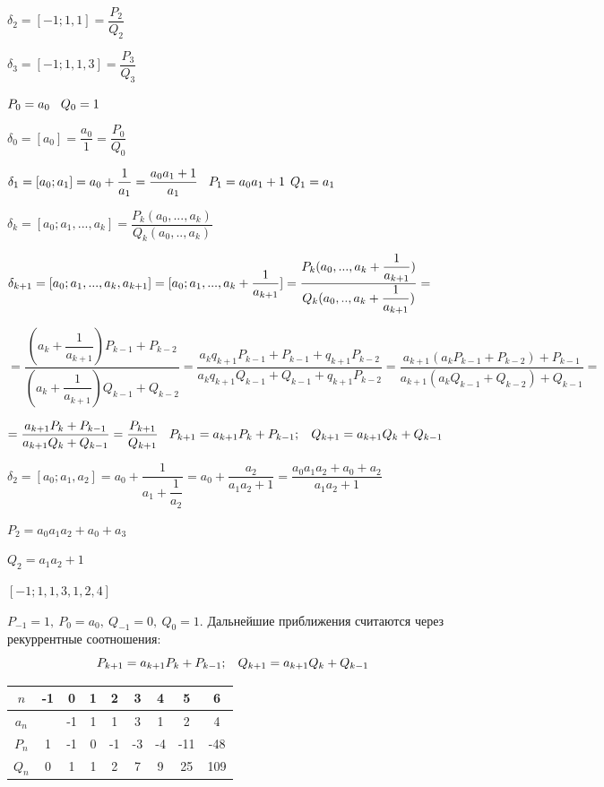 \documentclass[12pt]{article}
\begin{document}
$\delta_2 = [-1;1,1] = \dfrac{P_2}{Q_2}$

$\delta_3 = [-1;1,1,3] = \dfrac{P_3}{Q_3}$

$P_0 = a_0 \hspace{2 ex} Q_0 = 1$

$\delta_0 = [a_0] = \dfrac{a_0}{1} = \dfrac{P_0}{Q_0}$

$\delta_1 = [a_0; a_1] = a_0 + \dfrac{1}{a_1} = \dfrac{a_0 a_1 +1}{a_1} \hspace{2 ex} P_1 = a_0 a_1 +1 \hspace{1 ex} Q_1 = a_1$

$\delta_k = [a_0;a_1,...,a_k] = \dfrac{P_k(a_0,...,a_k)}{Q_k(a_0,..,a_k)}$

$\delta_{k+1} = [a_0;a_1,...,a_k,a_{k+1}] =[a_0;a_1,...,a_k+\dfrac{1}{ a_{k+1}}] =  \dfrac{P_k(a_0,...,a_k+\dfrac{1}{ a_{k+1}} )}{Q_k(a_0,..,a_k+\dfrac{1}{ a_{k+1}})} = \vspace{2 ex}$

$= \dfrac{(a_k + \dfrac{1}{a_{k+1}}) P_{k-1} + P_{k-2}}{(a_k + \dfrac{1}{a_{k+1}}) Q_{k-1} + Q_{k-2}} = \dfrac{a_k q_{k+1} P_{k-1} + P_{k-1} + q_{k+1} P_{k-2}}{a_k q_{k+1} Q_{k-1} + Q_{k-1} + q_{k+1} P_{k-2}} = \dfrac{a_{k+1} (a_k P_{k-1} + P_{k-2}) + P_{k-1}}{a_{k+1} (a_k Q_{k-1} + Q_{k-2}) + Q_{k-1}} = $

$= \dfrac{a_{k+1} P_k + P_{k-1}}{a_{k+1} Q_k + Q_{k-1}} = \dfrac{P_{k+1}}{Q_{k+1}} \hspace{2 ex} P_{k+1} = a_{k+1} P_k + P_{k-1} ; \hspace{2 ex} Q_{k+1} = a_{k+1} Q_k + Q_{k-1} \vspace{2 ex}$


$\delta_2 = [a_0;a_1,a_2] = a_0 + \dfrac{1}{a_1 + \dfrac{1}{a_2}} = a_0 + \dfrac{a_2}{a_1 a_2 + 1} = \dfrac{a_0 a_1 a_2 + a_0 + a_2}{a_1 a_2 + 1}$

$P_2 = a_0 a_1 a_2 + a_0 + a_3$

$Q_2 = a_1 a_2 +1$

$[-1;1,1,3,1,2,4]$

$P_{-1} = 1, \ P_0 = a_0,\ Q_{-1} = 0, \ Q_0 = 1$. Дальнейшие приближения считаются через рекуррентные соотношения:
\[
    P_{k+1} = a_{k+1} P_k + P_{k-1} ; \hspace{2 ex} Q_{k+1} = a_{k+1} Q_k + Q_{k-1}
\]

\begin{tabular}{|c|c|c|c|c|c|c|c|c|}
    \hline
    $n$   & -1 & 0  & 1 & 2  & 3  & 4  & 5   & 6   \\
    \hline
    $a_n$ &    & -1 & 1 & 1  & 3  & 1  & 2   & 4   \\
    \hline
    $P_n$ & 1  & -1 & 0 & -1 & -3 & -4 & -11 & -48 \\
    \hline
    $Q_n$ & 0  & 1  & 1 & 2  & 7  & 9  & 25  & 109 \\
    \hline
\end{tabular}
\end{document}
